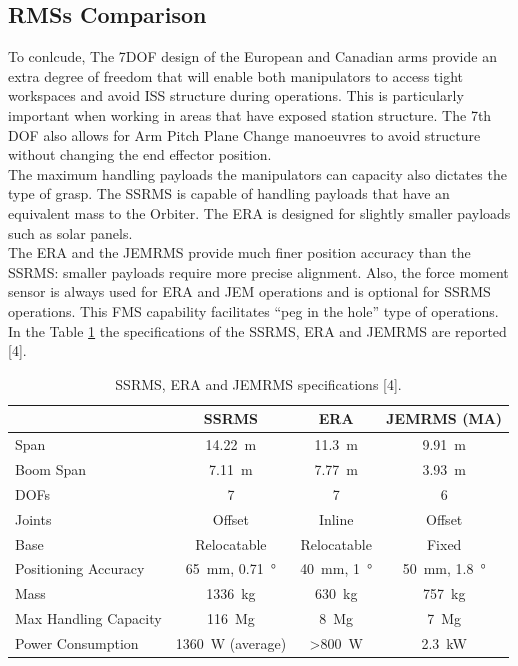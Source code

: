 \documentclass[a4paper,12pt,oneside]{report}
\begin{document}
\subsection{RMSs Comparison}
To conlcude, The 7DOF design of the European and Canadian arms provide an extra degree of freedom that will enable both manipulators to access tight workspaces and avoid ISS structure during operations. This is particularly important when working in areas that have exposed station structure. The 7th DOF also allows for Arm Pitch Plane Change manoeuvres to avoid structure without changing the end effector position.\\
The maximum handling payloads the manipulators can capacity also dictates the type of grasp. The SSRMS is capable of handling payloads that have an equivalent mass to the Orbiter. The ERA is designed for slightly smaller payloads such as solar panels.\\
The ERA and the JEMRMS provide much finer position accuracy than the SSRMS: smaller payloads require more precise alignment. Also, the force moment sensor is always used for ERA and JEM operations and is optional for SSRMS operations. This FMS capability facilitates “peg in the hole” type of operations.
In the Table \ref{SRMs_comparison} the specifications of the SSRMS, ERA and JEMRMS are reported [4].
  \begin{table}[h]
    \caption{SSRMS, ERA and JEMRMS specifications [4].}
    \label{SRMs_comparison}
    \begin{center}
    \begin{tabular}{lccc}
      \toprule
    & \textbf{SSRMS} & \textbf{ERA} & \textbf{JEMRMS (MA)}\\
    \midrule
    Span&\SI{14.22}{\metre}&\SI{11.3}{\metre}&\SI{9.91}{\metre}\\
    Boom Span&\SI{7.11}{\metre}&\SI{7.77}{\metre}&\SI{3.93}{\metre}\\
    DOFs&7&7&6\\
    Joints&Offset&Inline&Offset\\
    Base&Relocatable&Relocatable&Fixed\\
    Positioning Accuracy&\SI{65}{\milli\metre}, \SI{0.71}{\degree}&\SI{40}{\milli\metre}, \SI{1}{\degree}&\SI{50}{\milli\metre}, \SI{1.8}{\degree}\\
    Mass&\SI{1336}{\kilogram}&\SI{630}{\kilogram}&\SI{757}{\kilogram}\\
    Max Handling Capacity&\SI{116}{\mega\gram}&\SI{8}{\mega\gram}&\SI{7}{\mega\gram}\\
    Power Consumption&\SI{1360}{\watt} (average)&>\SI{800}{\watt}&\SI{2.3}{\kilo\watt}\\
    \bottomrule
    \end{tabular}
    \end{center}
    \end{table}
\end{document}
